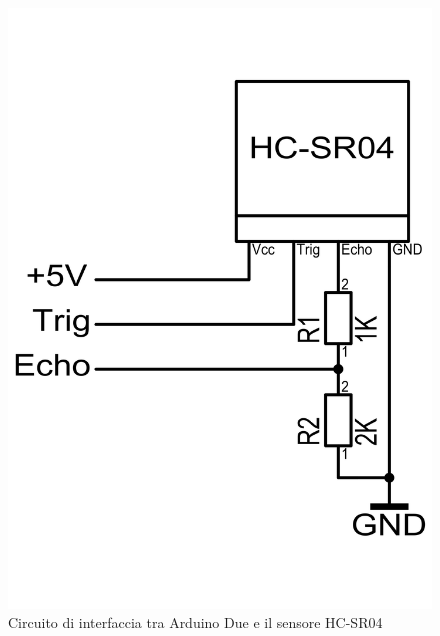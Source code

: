 \begin{figure}[H] \center
\includegraphics[scale=0.3]{immagini/HC-SR04_Circuito.png}
\caption{Circuito di interfaccia tra Arduino Due e il sensore HC-SR04} 
\end{figure}

